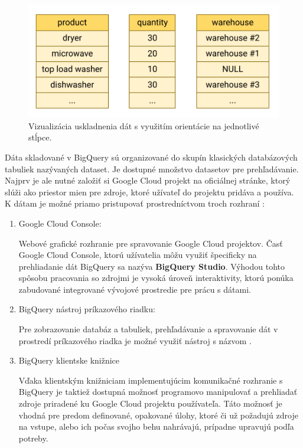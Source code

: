 \begin{figure}[htb]
\begin{center}
 \includegraphics[scale=0.7]{obrazky-figures/column-oriented-store.png}
 \caption{\centering Vizualizácia uskladnenia dát s využitím orientácie na jednotlivé stĺpce.}
 \label{img:column-oriented-store}
\end{center}
\end{figure}

Dáta skladované v BigQuery sú organizované do skupín klasických databázových tabuliek nazývaných dataset.
Je dostupné množstvo datasetov pre prehľadávanie.
Najprv je ale nutné založiť si Google Cloud projekt na oficiálnej stránke, ktorý slúži ako priestor mien pre zdroje, ktoré užívateľ do projektu pridáva a používa.
K dátam je možné priamo pristupovať prostredníctvom troch rozhraní \cite{google-cloud}:
\begin{enumerate}
    \item Google Cloud Console:

    Webové grafické rozhranie pre spravovanie Google Cloud projektov. 
    Časť Google Cloud Console, ktorú užívatelia môžu využiť špecificky na prehliadanie dát BigQuery sa nazýva \textbf{BigQuery Studio}.
    Výhodou tohto spôsobu pracovania so zdrojmi je vysoká úroveň interaktivity, ktorú ponúka zabudované integrované vývojové prostredie pre prácu s dátami. 

    \item BigQuery nástroj príkazového riadku:

    Pre zobrazovanie databáz a tabuliek, prehľadávanie a spravovanie dát v prostredí príkazového riadka je možné využiť nástroj s názvom . 
    
    \item BigQuery klientske knižnice

    Vďaka klientským knižniciam implementujúcim komunikačné rozhranie s BigQuery je taktiež dostupná možnosť programovo manipulovať a prehliadať zdroje priradené ku Google Cloud projektu používateľa.
    Táto možnosť je vhodná pre predom definované, opakované úlohy, ktoré či už požadujú zdroje na vstupe, alebo ich počas svojho behu nahrávajú, prípadne upravujú podľa potreby.
\end{enumerate}

